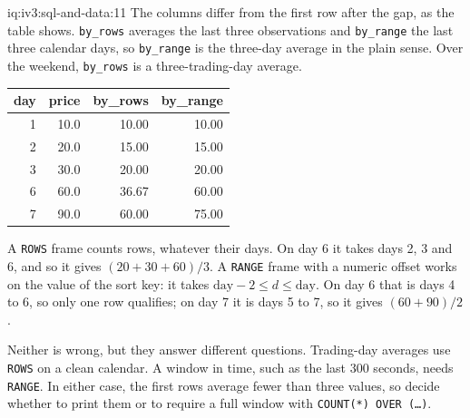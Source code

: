 \begin{solution}{iq:iv3:sql-and-data:11}
The columns differ from the first row after the gap, as the table shows. \texttt{by\_rows} averages the last three observations and \texttt{by\_range} the last three calendar days, so \texttt{by\_range} is the three-day average in the plain sense. Over the weekend, \texttt{by\_rows} is a three-trading-day average.
\begin{center}\small
\begin{tabular}{rrrr}
day & price & by\_rows & by\_range\\\hline
1 & 10.0 & 10.00 & 10.00\\
2 & 20.0 & 15.00 & 15.00\\
3 & 30.0 & 20.00 & 20.00\\
6 & 60.0 & 36.67 & 60.00\\
7 & 90.0 & 60.00 & 75.00
\end{tabular}
\end{center}
A \texttt{ROWS} frame counts rows, whatever their days. On day 6 it takes days 2, 3 and 6, and so it gives $(20 + 30 + 60) / 3$. A \texttt{RANGE} frame with a numeric offset works on the value of the sort key: it takes $\text{day} - 2 \le d \le \text{day}$. On day 6 that is days 4 to 6, so only one row qualifies; on day 7 it is days 5 to 7, so it gives $(60 + 90)/2$.

Neither is wrong, but they answer different questions. Trading-day averages use \texttt{ROWS} on a clean calendar. A window in time, such as the last 300 seconds, needs \texttt{RANGE}. In either case, the first rows average fewer than three values, so decide whether to print them or to require a full window with \texttt{COUNT(*) OVER (\dots)}.

\end{solution}

